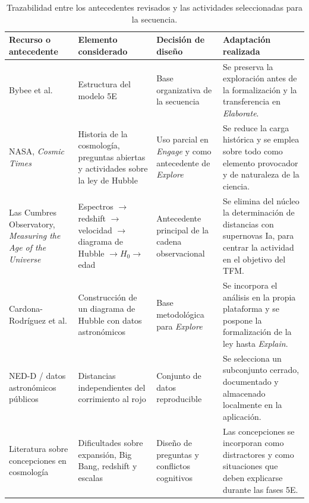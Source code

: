 \begin{table}[htbp]
\centering
\caption{Trazabilidad entre los antecedentes revisados y las actividades seleccionadas para la secuencia.}\label{tab:trazabilidad5e}
\begin{tabularx}{\textwidth}{|>{\raggedright\arraybackslash}p{2.4cm}|>{\raggedright\arraybackslash}X|>{\raggedright\arraybackslash}X|>{\raggedright\arraybackslash}X|}
\hline
\rowcolor{naranja}
{\color{white}\textbf{Recurso o antecedente}} & {\color{white}\textbf{Elemento considerado}} & {\color{white}\textbf{Decisión de diseño}} & {\color{white}\textbf{Adaptación realizada}} \\ \hline
Bybee et al. & Estructura del modelo 5E & Base organizativa de la secuencia & Se preserva la exploración antes de la formalización y la transferencia en \textit{Elaborate}. \\ \hline
NASA, \textit{Cosmic Times} & Historia de la cosmología, preguntas abiertas y actividades sobre la ley de Hubble & Uso parcial en \textit{Engage} y como antecedente de \textit{Explore} & Se reduce la carga histórica y se emplea sobre todo como elemento provocador y de naturaleza de la ciencia. \\ \hline
Las Cumbres Observatory, \textit{Measuring the Age of the Universe} & Espectros $\rightarrow$ redshift $\rightarrow$ velocidad $\rightarrow$ diagrama de Hubble $\rightarrow H_0 \rightarrow$ edad & Antecedente principal de la cadena observacional & Se elimina del núcleo la determinación de distancias con supernovas Ia, para centrar la actividad en el objetivo del TFM. \\ \hline
Cardona-Rodríguez et al. & Construcción de un diagrama de Hubble con datos astronómicos & Base metodológica para \textit{Explore} & Se incorpora el análisis en la propia plataforma y se pospone la formalización de la ley hasta \textit{Explain}. \\ \hline
NED-D / datos astronómicos públicos & Distancias independientes del corrimiento al rojo & Conjunto de datos reproducible & Se selecciona un subconjunto cerrado, documentado y almacenado localmente en la aplicación. \\ \hline
Literatura sobre concepciones en cosmología & Dificultades sobre expansión, Big Bang, redshift y escalas & Diseño de preguntas y conflictos cognitivos & Las concepciones se incorporan como distractores y como situaciones que deben explicarse durante las fases 5E. \\ \hline
\end{tabularx}
\end{table}

